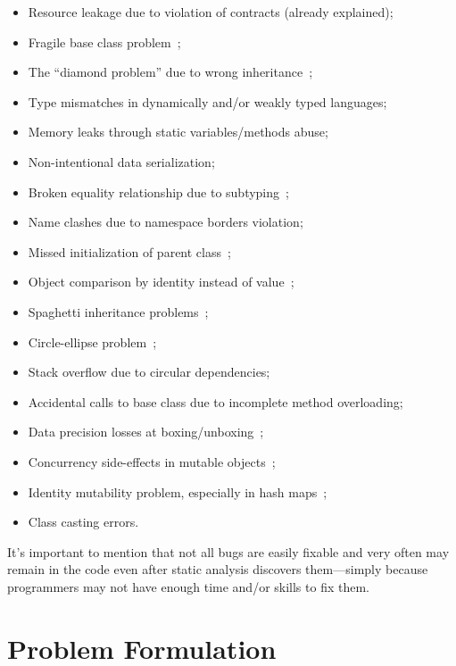 \documentclass[nosecurity,nobrand]{huawei}
\begin{document}
\begin{itemize}
\item Resource leakage due to violation of contracts (already explained);
\item Fragile base class problem~\citep{mikhajlov1998study};
\item The ``diamond problem'' due to wrong inheritance~\citep{roebuck2011};
\item Type mismatches in dynamically and/or weakly typed languages;
\item Memory leaks through static variables/methods abuse;
\item Non-intentional data serialization;
\item Broken equality relationship due to subtyping~\citep{sarcar2020};
\item Name clashes due to namespace borders violation;
\item Missed initialization of parent class~\citep{roebuck2011};
\item Object comparison by identity instead of value~\citep{bloch2016effective};
\item Spaghetti inheritance problems~\citep{geetha08};
\item Circle-ellipse problem~\citep{majorinc1998elipse};
\item Stack overflow due to circular dependencies;
\item Accidental calls to base class due to incomplete method overloading;
\item Data precision losses at boxing/unboxing~\citep{bloch2016effective};
\item Concurrency side-effects in mutable objects~\citep{goetz2006java};
\item Identity mutability problem, especially in hash maps~\citep{goetz2006java};
\item Class casting errors.
\end{itemize}

It's important to mention that not all bugs are easily fixable and
very often may remain in the code even after static analysis discovers
them---simply because programmers may not have enough time and/or skills
to fix them.

\section{Problem Formulation}
\end{document}
